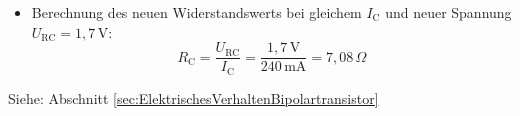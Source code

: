 {\begin{itemize}
        \item[c)] Berechnung des neuen Widerstandswerts bei gleichem $I_\mathrm{C}$ und neuer Spannung $U_\mathrm{RC} = 1,7\,\mathrm{V}$:
              \begin{equation*}
                  R_\mathrm{C} = \frac{U_\mathrm{RC}}{I_\mathrm{C}} = \frac{1,7\,\mathrm{V}}{240\,\mathrm{mA}} = 7,08\,\Omega
              \end{equation*}
    \end{itemize}

    Siehe: Abschnitt \ref{sec:ElektrischesVerhaltenBipolartransistor}
}